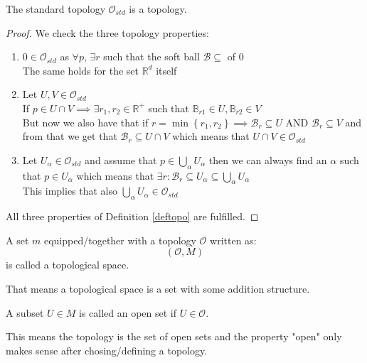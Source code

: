 \begin{framed}
\begin{lemma}
    The standard topology $\mathcal{O}_{std}$ is a topology.    
\end{lemma}
\end{framed}
\begin{proof}
We check the three topology properties:
\begin{enumerate}[itemsep=3pt, topsep=3pt]
    \item $0\in \mathcal{O}_{std}$ as $\forall p$, $\exists r$ such that the soft ball $\mathcal{B}\subseteq$ of $0$\\ The same holds for the set $\mathbb{R}^d$ itself
    \item Let $U,V \in \mathcal{O}_{std}$\\ If $p\in U\cap V \implies \exists r_1, r_2 \in \mathbb{R}^+$ such that $\mathbb{B}_{r1}\in U,\mathbb{B}_{r2} \in V$ \\ But now we also have that if $r=\min \left\{r_1, r_2\right\} \implies \mathcal{B}_r \subseteq U$ AND $\mathcal{B}_r \subseteq V  $ and from that we get that $\mathcal{B}_r \subseteq U \cap V$ which means that $U \cap V \in \mathcal{O}_{std}$
    \item Let $U_\alpha \in \mathcal{O}_{std}$ and assume that $p \in \bigcup_{\alpha} U_\alpha $ then we can always find an $ \alpha$ such that $p \in U_\alpha$ which means that $\exists r : \mathcal{B}_r \subseteq U_\alpha \subseteq \bigcup_{\alpha} U_\alpha$\\ This implies that also $\bigcup_{\alpha} U_\alpha \in \mathcal{O}_{std}$
\end{enumerate}
All three properties of Definition \ref{deftopo} are fulfilled.
\end{proof}



\begin{framed}
\begin{definition}
    A set $m$ equipped/together with a topology $\mathcal{O}$ written as:
    $$(\mathcal{O}, M)$$
    is called a topological space.
\end{definition}
\end{framed}
That means a topological space is a set with some addition structure.

\begin{framed}
\begin{definition}
    A subset $U \in M$ is called an open set if $U \in \mathcal{O}$.
\end{definition}
\end{framed}
This means the topology is the set of open sets and the property "open" only makes sense after chosing/defining a topology.

